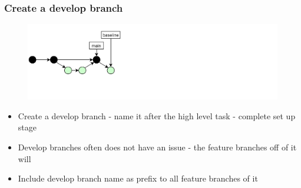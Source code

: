 \documentclass[aspectratio=169]{beamer} %
\begin{document}
\begin{frame}
	\frametitle{Create a develop branch}
	
	\vspace{-.5cm}
	\begin{minipage}[t][5cm][t]{\textwidth}
		\begin{figure}
			\centering
			\includegraphics[width=\textwidth]{./img/dime-gitflow-network-2-1.png}
		\end{figure}
	\end{minipage}  
	
	\vspace{-.5cm}
	\begin{minipage}[t][5cm][t]{\textwidth}
		\begin{itemize}
			\setlength\itemsep{.5em}
			\item Create a develop branch - name it after the high level task - complete set up stage
			\item Develop branches often does not have an issue - the feature branches off of it will
			\item Include develop branch name as prefix to all feature branches of it
		\end{itemize}
	\end{minipage}  
\end{frame}
\end{document}
